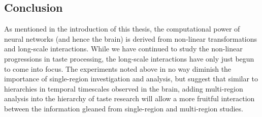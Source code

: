 \begin{refsection}
\section{Conclusion}
As mentioned in the introduction of this thesis, the computational power of neural networks (and hence the brain) is derived from non-linear transformations and long-scale interactions. While we have continued to study the non-linear progressions in taste processing, the long-scale interactions have only just begun to come into focus. The experiments noted above in no way diminish the importance of single-region investigation and analysis, but suggest that similar to hierarchies in temporal timescales observed in the brain, adding multi-region analysis into the hierarchy of taste research will allow a more fruitful interaction between the information gleaned from single-region and multi-region studies.

\begin{singlespace}
\printbibliography[title={References}]
\end{singlespace}

\end{refsection}